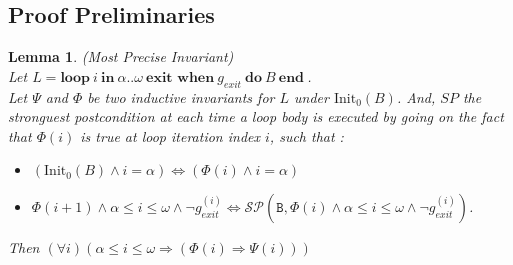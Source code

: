 \documentclass[a4paper,10pt]{article}
\newcommand{\idx}{\ensuremath{i}\xspace}
\newcommand{\idxinitial}{\ensuremath{\alpha}\xspace}
\newcommand{\idxfinal}{\ensuremath{\omega}\xspace}
\newcommand{\Init}{\ensuremath{\mathrm{Init_{0}}}}
\newcommand{\KWloop}{\ensuremath{\mathrm{\textbf{loop}}~}}
\newcommand{\KWdo}{\ensuremath{\mathrm{\textbf{do}}~}}
\newcommand{\KWend}{\ensuremath{\mathrm{\textbf{end}}~}}
\newcommand{\KWin}{\ensuremath{~\mathrm{\textbf{in}}~}}
\newcommand{\KWexit}{\ensuremath{\mathrm{\textbf{exit when}}~}}
\newcommand{\at}[1]{{(#1)}}
\newtheorem{lemma}[theorem]{Lemma}
\newcommand{\spostsym}{\ensuremath{\mathcal{SP}}\xspace}
\newcommand{\spost}[2]{\ensuremath{\spostsym(#1,#2)}}
\begin{document}
\subsection{Proof Preliminaries}
\label{sec:proof-pre}

\begin{lemma} \emph {(Most Precise Invariant)}\\
\label{lem:precise-inv}
Let $L = \KWloop  \idx \KWin \idxinitial ..\idxfinal ~ \KWexit g_{exit}~ \KWdo B ~\KWend$.\\
Let $\Psi$ and  $\Phi$ be two inductive invariants for $L$ under
$\Init(B)$. And, $SP$ the stronguest postcondition at each time a loop body 
is executed by going on the fact that $\Phi(\idx)$ is true at loop iteration index \idx, 
such that : 
\begin{itemize}
\item[(a)] $(\Init(B) \land \idx = \idxinitial) \Leftrightarrow (\Phi(\idx) \land \idx=\idxinitial)$ 
\item[(b)] $\Phi(\idx+1) \wedge \idxinitial \leq \idx \leq \idxfinal \land \neg g_{exit}^\at{\idx} \Leftrightarrow 
          \spost{\texttt{B}}{\Phi(\idx) \land \idxinitial \leq \idx \leq \idxfinal \land \neg g_{exit}^\at{\idx}}$.
\end{itemize}
Then $(\forall \idx) (\idxinitial \leq \idx \leq \idxfinal \Rightarrow (\Phi(\idx) \Rightarrow \Psi(\idx)))$
\end{lemma}
\end{document}
